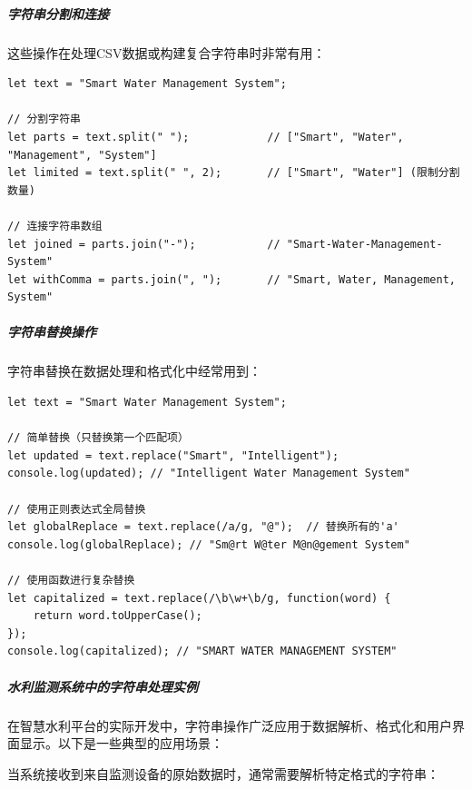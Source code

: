\hypertarget{ux5b57ux7b26ux4e32ux5206ux5272ux548cux8fdeux63a5}{%
\subparagraph{字符串分割和连接}\label{ux5b57ux7b26ux4e32ux5206ux5272ux548cux8fdeux63a5}}

这些操作在处理CSV数据或构建复合字符串时非常有用：

\begin{lstlisting}[style=javascript]
let text = "Smart Water Management System";

// 分割字符串
let parts = text.split(" ");            // ["Smart", "Water", "Management", "System"]
let limited = text.split(" ", 2);       // ["Smart", "Water"] (限制分割数量)

// 连接字符串数组
let joined = parts.join("-");           // "Smart-Water-Management-System"
let withComma = parts.join(", ");       // "Smart, Water, Management, System"
\end{lstlisting}

\hypertarget{ux5b57ux7b26ux4e32ux66ffux6362ux64cdux4f5c}{%
\subparagraph{字符串替换操作}\label{ux5b57ux7b26ux4e32ux66ffux6362ux64cdux4f5c}}

字符串替换在数据处理和格式化中经常用到：

\begin{lstlisting}[style=javascript]
let text = "Smart Water Management System";

// 简单替换（只替换第一个匹配项）
let updated = text.replace("Smart", "Intelligent");
console.log(updated); // "Intelligent Water Management System"

// 使用正则表达式全局替换
let globalReplace = text.replace(/a/g, "@");  // 替换所有的'a'
console.log(globalReplace); // "Sm@rt W@ter M@n@gement System"

// 使用函数进行复杂替换
let capitalized = text.replace(/\b\w+\b/g, function(word) {
    return word.toUpperCase();
});
console.log(capitalized); // "SMART WATER MANAGEMENT SYSTEM"
\end{lstlisting}

\hypertarget{ux6c34ux5229ux76d1ux6d4bux7cfbux7edfux4e2dux7684ux5b57ux7b26ux4e32ux5904ux7406ux5b9eux4f8b}{%
\subparagraph{水利监测系统中的字符串处理实例}\label{ux6c34ux5229ux76d1ux6d4bux7cfbux7edfux4e2dux7684ux5b57ux7b26ux4e32ux5904ux7406ux5b9eux4f8b}}

在智慧水利平台的实际开发中，字符串操作广泛应用于数据解析、格式化和用户界面显示。以下是一些典型的应用场景：


当系统接收到来自监测设备的原始数据时，通常需要解析特定格式的字符串：

